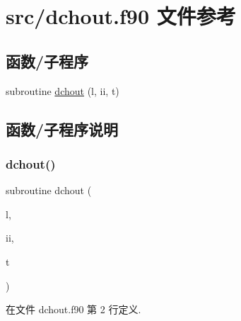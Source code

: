 \hypertarget{dchout_8f90}{}\section{src/dchout.f90 文件参考}
\label{dchout_8f90}
\subsection*{函数/子程序}
\begin{DoxyCompactItemize}
\item 
subroutine \mbox{\hyperlink{dchout_8f90_af67e6cac5eaad8f17f514d84fbb35aeb}{dchout}} (l, ii, t)
\end{DoxyCompactItemize}


\subsection{函数/子程序说明}
\mbox{\label{dchout_8f90_af67e6cac5eaad8f17f514d84fbb35aeb}} 
\subsubsection{\texorpdfstring{dchout()}{dchout()}}
{\footnotesize\ttfamily subroutine dchout (\begin{DoxyParamCaption}\item[{}]{l,  }\item[{}]{ii,  }\item[{}]{t }\end{DoxyParamCaption})}



在文件 dchout.\+f90 第 2 行定义.

